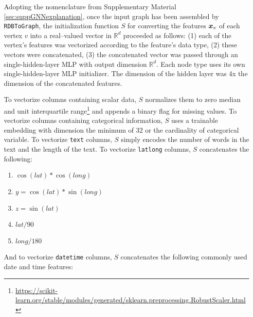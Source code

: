 \documentclass{article}
\begin{document}
Adopting the nomenclature from Supplementary Material \ref{sec:suppGNNexplanation}, once the input graph has been assembled by \texttt{RDBToGraph}, the initialization function $S$ for converting the features ${\bm{x}}_v$ of each vertex $v$ into a real--valued vector in $\mathbb{R}^{d}$ proceeded as follows: (1) each of the vertex's features was vectorized according to the feature's data type, (2) these vectors were concatenated, (3) the concatenated vector was passed through an single-hidden-layer MLP with output dimension $\mathbb{R}^{d}$.  Each node type uses its own single-hidden-layer MLP initializer.  The dimension of the hidden layer was 4x the dimension of the concatenated features.

To vectorize columns containing scalar data, $S$ normalizes them to zero median and unit interquartile range\footnote{\url{https://scikit-learn.org/stable/modules/generated/sklearn.preprocessing.RobustScaler.html}} and appends a binary flag for missing values.  To vectorize columns containing categorical information, $S$ uses a trainable embedding with dimension the minimum of 32 or the cardinality of categorical variable.  To vectorize \texttt{text} columns, $S$ simply encodes the number of words in the text and the length of the text.  To vectorize \texttt{latlong} columns, $S$ concatenates the following:
\begin{enumerate}
    \item $\cos(lat) * \cos(long)$
    \item $y = \cos(lat) * \sin(long)$
    \item $z = \sin(lat)$
    \item $lat / 90$
    \item $long / 180$
\end{enumerate}
And to vectorize \texttt{datetime} columns, $S$ concatenates the following commonly used date and time features:
\end{document}

